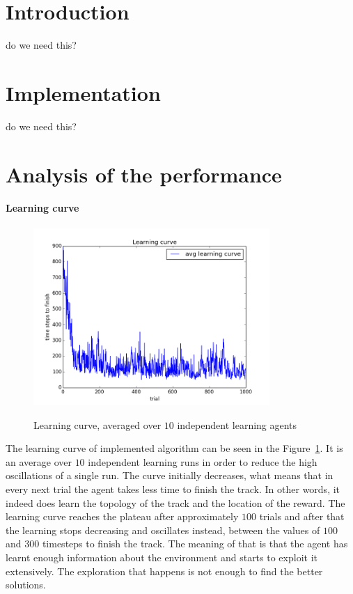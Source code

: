 \section{Introduction}
do we need this?

\section{Implementation}
do we need this?

\section{Analysis of the performance}

\paragraph{Learning curve}

\begin{figure}[h!]
\centering
\includegraphics[width=0.8\textwidth]{figures/learning_curve.png}
\label{fig:lcurve}
\caption{Learning curve, averaged over $10$ independent learning agents}
\end{figure}

The learning curve of implemented algorithm can be seen in the
Figure~\ref{fig:lcurve}. It is an average over $10$ independent learning runs in
order to reduce the high oscillations of a single run. The curve initially
decreases, what means that in every next trial the agent takes less time to
finish the track. In other words, it indeed does learn the topology of the track
and the location of the reward. The learning curve reaches the plateau after
approximately $100$ trials and after that the learning stops decreasing and
oscillates instead, between the values of $100$ and $300$ timesteps to finish
the track. The meaning of that is that the agent has learnt enough information
about the environment and starts to exploit it extensively. The exploration that
happens is not enough to find the better solutions.

